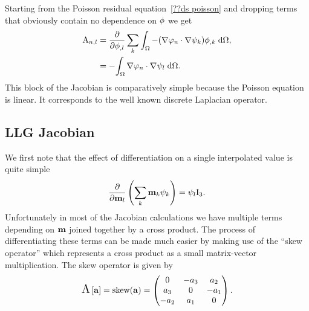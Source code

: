 Starting from the Poisson residual equation~\eqref{??ds poisson} and dropping terms that obviously contain no dependence on $\phi$ we get
\begin{equation}
  \begin{aligned}
    \label{eq:poisson-jacobian}
    \mathrm{A}_{n,l} &= \frac{\partial }{\partial \phi_{,l}} \sum_k {\int_{\Omega}  -(\nabla \varphi_n \cdot \nabla \psi_k) \phi_{,k} {\; \text{d}} {\Omega}}, \\
    &= -{\int_{\Omega} \nabla \varphi_n \cdot \nabla \psi_l {\; \text{d}} {\Omega}}.
  \end{aligned}
\end{equation}
This block of the Jacobian is comparatively simple because the Poisson equation is linear. 
It corresponds to the well known discrete Laplacian operator\cite{HowardElmanDavidSilvester2006}.


\subsection{LLG Jacobian}
\label{sec:llg-jacobian}

We first note that the effect of differentiation on a single interpolated value is quite simple
\begin{equation}
  \frac{\partial }{\partial \mathbf{m}_l} \left( \sum_k \mathbf{m}_k {\psi_k} \right) = \psi_l \text{I}_3.
\end{equation}
Unfortunately in most of the Jacobian calculations we have multiple terms depending on $\mathbf{m}$ joined together by a cross product.
The process of differentiating these terms can be made much easier by making use of the ``skew operator'' which represents a cross product as a small matrix-vector multiplication.
The skew operator is given by
\begin{equation}
  \text{\Large{$\Lambda$}}\left[ {\mathbf{a}} \right] = \text{skew}({\mathbf{a}}) =
  \begin{pmatrix}
    0 & -a_3 & a_2 \\
    a_3 & 0 & -a_1 \\
    -a_2 & a_1 & 0
  \end{pmatrix}.
  \label{eqn:skew}
\end{equation}

